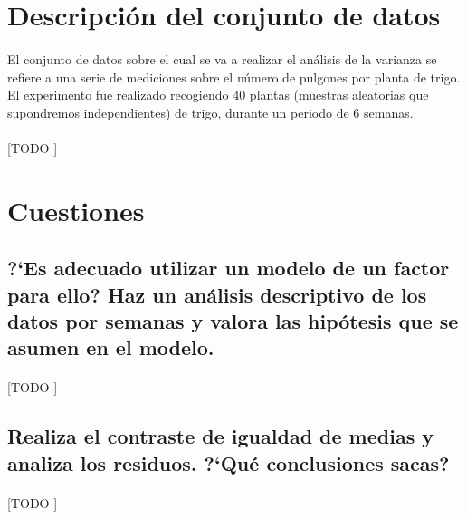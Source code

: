 \documentclass{article}
\begin{document}
  \maketitle


  \section{Descripción del conjunto de datos}

    \paragraph{}
    El conjunto de datos sobre el cual se va a realizar el análisis de la varianza se refiere a una serie de mediciones sobre el número de pulgones por planta de trigo. El experimento fue realizado recogiendo $40$ plantas (muestras aleatorias que supondremos independientes) de trigo, durante un periodo de $6$ semanas.

    \paragraph{}
    [TODO ]

  \section{Cuestiones}

    \subsection{?`Es adecuado utilizar un modelo de un factor para ello? Haz un análisis descriptivo de los datos por semanas y valora las hipótesis que se asumen en el modelo.}

      \paragraph{}
      [TODO ]


    \subsection{Realiza el contraste de igualdad de medias y analiza los residuos. ?`Qué conclusiones sacas?}

      \paragraph{}
      [TODO ]
\end{document}
